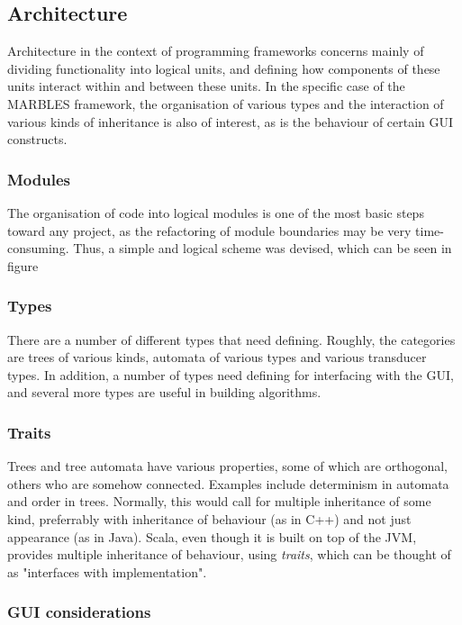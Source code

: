 \subsection{Architecture}

Architecture in the context of programming frameworks concerns mainly of
dividing functionality into logical units, and defining how components of
these units interact within and between these units. In the specific case
of the MARBLES framework, the organisation of various types and the
interaction of various kinds of inheritance is also of interest, as is the
behaviour of certain GUI constructs.

\subsubsection{Modules}

The organisation of code into logical modules is one of the most basic
steps toward any project, as the refactoring of module boundaries may be
very time-consuming. Thus, a simple and logical scheme was devised, which
can be seen in figure %

\subsubsection{Types}

There are a number of different types that need defining. Roughly, the
categories are trees of various kinds, automata of various types and
various transducer types. In addition, a number of types need defining for
interfacing with the GUI, and several more types are useful in building
algorithms.

\subsubsection{Traits}

Trees and tree automata have various properties, some of which are
orthogonal, others who are somehow connected. Examples include determinism
in automata and order in trees. Normally, this would call for multiple
inheritance of some kind, preferrably with inheritance of behaviour (as in
C++) and not just appearance (as in Java). Scala, even though it is built
on top of the JVM, provides multiple inheritance of behaviour, using
\emph{traits}, which can be thought of as "interfaces with implementation".


\subsubsection{GUI considerations}

